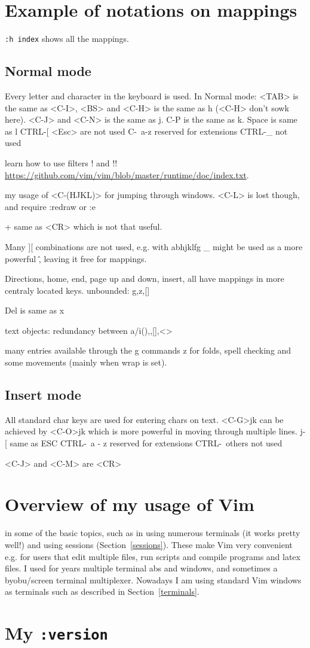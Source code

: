 \documentclass{article}
\newcommand{\tttt}[1] {
	\texttt{#1}}
\begin{document}
\section{Example of notations on mappings}\label{notes}
\texttt{:h index} shows all the mappings.
\subsection{Normal mode}
Every letter and character in the keyboard is used.
In Normal mode: <TAB> is the same as <C-I>,
<BS> and <C-H> is the same as h (<C-H> don't sowk here).
<C-J> and <C-N> is the same as j.
C-P is the same as k.
Space is same as l
CTRL-[ <Esc> are not used
C-\ a-z reserved for extensions
CTRL-\_ not used

learn how to use filters ! and !!
\url{https://github.com/vim/vim/blob/master/runtime/doc/index.txt}.

my usage of <C-(HJKL)> for jumping through windows.
<C-L> is lost though, and require :redraw or :e

+ same as <CR> which is not that useful.

Many ][ combinations are not used, e.g.
with abhjklfg
\_ might be used as a more powerful \^, leaving it free for mappings.

Directions, home, end, page up and down, insert, all have mappings
in more centraly located keys.
unbounded: g,z,[]

Del is same as x

text objects: redundancy between a/i(),{},[],<>

many entries available through the g commands
z for folds, spell checking and some movements (mainly when wrap is set).

\subsection{Insert mode}
All standard char keys are used for entering chars on text.
<C-G>jk can be achieved by <C-O>jk which is more powerful
in moving through multiple lines.
j-[ same as ESC
		CTRL-\ a - z	reserved for extensions
		CTRL-\ others	not used

<C-J> and <C-M> are <CR>

\section{Overview of my usage of Vim}
in some of the basic topics, such as in using numerous terminals 
(it works pretty well!) and using sessions (Section~\ref{sessions}).
These make Vim very convenient e.g. for users that edit multiple files,
run scripts and compile programs and latex files.
I used for years multiple terminal abs and windows,
and sometimes a byobu/screen terminal multiplexer.
Nowadays I am using standard Vim windows as terminals
such as described in Section~\ref{terminals}.

\section{My \tttt{:version}}

\end{document}
